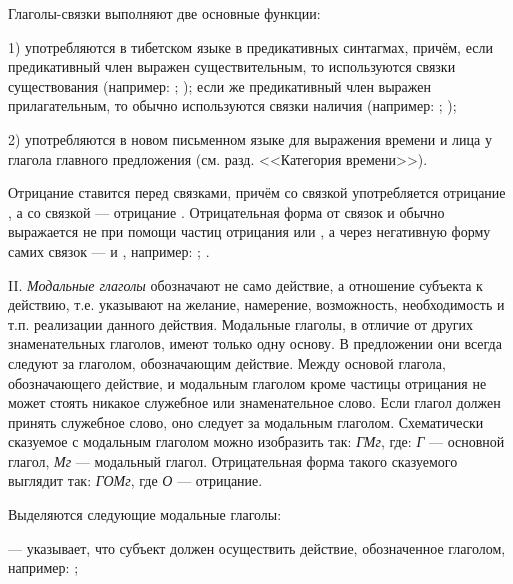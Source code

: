 Глаголы-связки выполняют две основные функции:

1) употребляются в тибетском языке в предикативных синтагмах, причём, если предикативный член выражен существительным, то используются связки существования
(например: ;
);
если же предикативный член выражен прилагательным, то обычно используются связки наличия (например: ;
);

2) употребляются в новом письменном языке для выражения времени и лица у глагола главного предложения (см. разд. <<Категория времени>>).

Отрицание ставится перед связками, причём со связкой  употребляется отрицание , а со связкой  --- отрицание . Отрицательная форма от связок  и  обычно выражается не при помощи частиц отрицания  или , а через негативную форму самих связок ---  и , например:
;
.

II. \emph{Модальные глаголы} обозначают не само действие, а отношение субъекта к действию, т.е. указывают на желание, намерение, возможность, необходимость и т.п. реализации данного действия. Модальные глаголы, в отличие от других знаменательных глаголов, имеют только одну основу. В предложении они всегда следуют за глаголом, обозначающим действие. Между основой глагола, обозначающего действие, и модальным глаголом кроме частицы отрицания не может стоять никакое служебное или знаменательное слово. Если глагол должен принять служебное слово, оно следует за модальным глаголом. Схематически сказуемое с модальным глаголом можно изобразить так: \emph{ГМг}, где: \emph{Г} --- основной глагол, \emph{Мг} --- модальный глагол. Отрицательная форма такого сказуемого выглядит так: \emph{ГОМг}, где \emph{О} --- отрицание.

Выделяются следующие модальные глаголы:

 --- указывает, что субъект должен осуществить действие, обозначенное глаголом, например:
;

